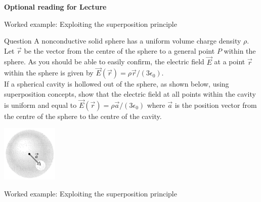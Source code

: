 %
%

\begin{frame}[plain,c]
\begin{center}
{\Huge \bf Optional reading for Lecture \thislecture}
\end{center}
\end{frame}


%
%

{
\problemslide

\begin{frame}{Worked example: Exploiting the superposition principle}

  \begin{blockexmplque}{Question}
    A nonconductive solid sphere has a uniform volume charge density $\rho$.\\
    \vspace{0.1cm}
    Let $\vec{r}$ be the vector from the centre of the sphere to a general point
    $P$ within the sphere. As you should be able to easily confirm,
    the electric field $\vec{E}$ at a point $\vec{r}$  within the sphere is
    given by $\vec{E}(\vec{r}) = \rho \vec{r}/(3\epsilon_0)$.\\
    \vspace{0.1cm}
    If a spherical cavity is hollowed out of the sphere, as shown below,
    using superposition concepts, show that the electric field at all points
    within the cavity is uniform and equal to
    $\vec{E}(\vec{r})=\rho \vec{a}/(3\epsilon_0)$
    where $\vec{a}$ is the position vector
    from the centre of the sphere to the centre of the cavity.\\
    \begin{center}
      \includegraphics[width=0.20\textwidth]{./images/problems/lect02_spherical_charge_distribution_with_hole}
    \end{center}
  \end{blockexmplque}

\end{frame}

%
%
%

\begin{frame}{Worked example: Exploiting the superposition principle}


\end{frame}}
